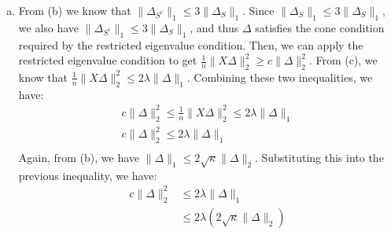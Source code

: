 \documentclass[11pt,a4paper,margin=1in]{article}
\begin{document}
\begin{enumerate}[(a)]
    Using the definition of the squared Euclidean norm, we have:
    \begin{align*}
        \frac{1}{n}\|X\Delta\|_2^2 &= \frac{1}{n}(X\Delta)^\top(X\Delta) \\
        &= \frac{1}{n}\Delta^\top X^\top X\Delta \\
        &= \Delta^\top\left(\frac{1}{n}X^\top X\Delta\right)
    \end{align*}
    We can use Holder's inequality for the $\ell_1$ and $\ell_\infty$ norms:
    \begin{align*}
        |a^\top b| &\leq \|a\|_1\|b\|_\infty \\
        a = \Delta, &b = \frac{1}{n}X^\top X\Delta \\
        \frac{1}{n}\|X\Delta\|_2^2 &= \Delta^\top\left(\frac{1}{n}X^\top X\Delta\right) \\
        &\leq |\Delta^\top\left(\frac{1}{n}X^\top X\Delta\right)| \\
        &\leq \|\Delta\|_1\left\|\frac{1}{n}X^\top X\Delta\right\|_\infty \\
        &\leq \|\Delta\|_1(2\lambda) \\
        &= 2\lambda\|\Delta\|_1
    \end{align*}
    Thus, $\frac{1}{n}\|X(\hat{\beta}_D - \beta^*)\|_2^2 \leq 2\lambda\|\hat{\beta}_D - \beta^*\|_1$.
    \item From (b) we know that $\|\Delta_{S^c}\|_1 \leq 3\|\Delta_S\|_1$. Since
    $\|\Delta_S\|_1 \leq 3\|\Delta_S\|_1$, we also have $\|\Delta_{S^c}\|_1 \leq 3\|\Delta_S\|_1$, 
    and thus $\Delta$ satisfies the cone condition required by the restricted eigenvalue condition. 
    Then, we can apply the restricted eigenvalue condition to get $\frac{1}{n}\|X\Delta\|_2^2 \geq c\|\Delta\|_2^2$.
    From (c), we know that $\frac{1}{n}\|X\Delta\|_2^2 \leq 2\lambda\|\Delta\|_1$. 
    Combining these two inequalities, we have:
    \begin{gather*}
        c\|\Delta\|^2_2 \leq \frac{1}{n}\|X\Delta\|_2^2 \leq 2\lambda\|\Delta\|_1 \\
        c\|\Delta\|^2_2 \leq 2\lambda\|\Delta\|_1 \\
    \end{gather*}
    Again, from (b), we have $\|\Delta\|_1 \leq 2\sqrt{\kappa}\|\Delta\|_2$. 
    Substituting this into the previous inequality, we have:
    \begin{align*}
        c\|\Delta\|^2_2 &\leq 2\lambda\|\Delta\|_1 \\
        &\leq 2\lambda(2\sqrt{\kappa}\|\Delta\|_2) \\

\end{align*}
\end{enumerate}
\end{document}
